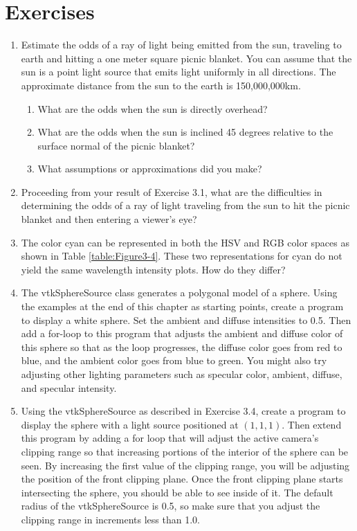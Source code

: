 \section{Exercises}
\begin{enumerate}

\item Estimate the odds of a ray of light being emitted from the sun, traveling to earth and hitting a one meter square picnic blanket. You can assume that the sun is a point light source that emits light uniformly in all directions. 
The approximate distance from the sun to the earth is 150,000,000km.

\begin{enumerate}

    \item What are the odds when the sun is directly overhead?

    \item What are the odds when the sun is inclined 45 degrees relative to the surface normal of the picnic blanket?

    \item What assumptions or approximations did you make?

\end{enumerate}

\item Proceeding from your result of Exercise 3.1, what are the difficulties in determining the odds of a ray of light traveling from the sun to hit the picnic blanket and then entering a viewer's eye?

\item The color cyan can be represented in both the HSV and RGB color spaces as shown in Table \ref{table:Figure3-4}. These two representations for cyan do not yield the same wavelength intensity plots. How do they differ?

\item The vtkSphereSource class generates a polygonal model of a sphere.
Using the examples at the end of this chapter as starting points, create a program to display a white sphere.
Set the ambient and diffuse intensities to 0.5. Then add a for-loop to this program that adjusts the ambient and diffuse color of this sphere so that as the loop progresses, the diffuse color goes from red to blue, and the ambient color goes from blue to green.
You might also try adjusting other lighting parameters such as specular color, ambient, diffuse, and specular intensity.

\item Using the vtkSphereSource as described in Exercise 3.4, create a program to display the sphere with a light source positioned at $(1,1,1)$. Then extend this program by adding a for loop that will adjust the active camera's clipping range so that increasing portions of the interior of the sphere can be seen.
By increasing the first value of the clipping range, you will be adjusting the position of the front clipping plane.
Once the front clipping plane starts intersecting the sphere, you should be able to see inside of it.
The default radius of the vtkSphereSource is 0.5, so make sure that you adjust the clipping range in increments less than 1.0.


\end{enumerate}

